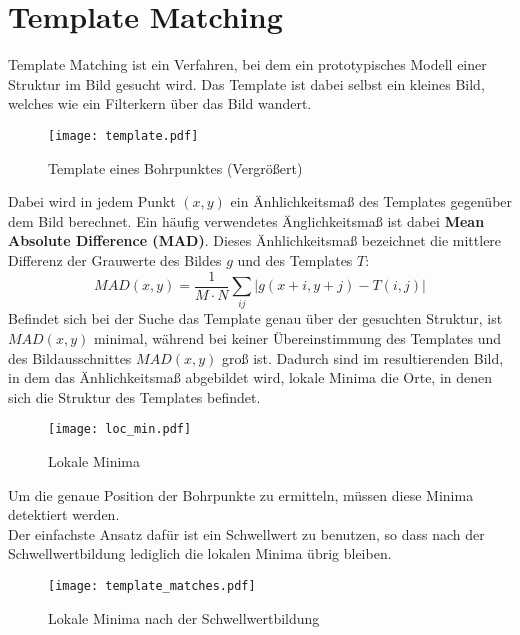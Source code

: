 \section{Template Matching}
	Template Matching ist ein Verfahren, bei dem ein prototypisches Modell einer Struktur im Bild gesucht wird. Das Template ist dabei selbst ein kleines Bild, welches wie ein Filterkern über das Bild wandert.
\begin{figure}[H]
  \begin{center}
    \texttt{[image: template.pdf]}
    \caption{Template eines Bohrpunktes (Vergrößert)}
    \label{fig:template}
  \end{center}
\end{figure}
Dabei wird in jedem Punkt $(x, y)$ ein Änhlichkeitsmaß des Templates gegenüber dem Bild berechnet.
Ein häufig verwendetes Änglichkeitsmaß ist dabei \textbf{Mean Absolute Difference (MAD)}.
Dieses Änhlichkeitsmaß bezeichnet die mittlere Differenz der Grauwerte des Bildes $g$ und des Templates $T$:
\begin{equation*}
MAD(x, y) = \frac{1}{M \cdot N} \sum_{ij}^{{}} \left | g(x +i, y + j) - T(i, j) \right |
\end{equation*}
Befindet sich bei der Suche das Template genau über der gesuchten Struktur, ist $MAD(x, y)$ minimal, während bei keiner Übereinstimmung des Templates und des Bildausschnittes $MAD(x, y)$ groß ist. Dadurch sind im resultierenden Bild, in dem das Änhlichkeitsmaß abgebildet wird, lokale Minima die Orte, in denen sich die Struktur des Templates befindet.
\begin{figure}[H]
  \begin{center}
    \texttt{[image: loc\_min.pdf]}
    \caption{Lokale Minima}
    \label{fig:localminima}
  \end{center}
\end{figure}

Um die genaue Position der Bohrpunkte zu ermitteln, müssen diese Minima detektiert werden.\\
Der einfachste Ansatz dafür ist ein Schwellwert zu benutzen, so dass nach der Schwellwertbildung lediglich die lokalen Minima übrig bleiben.
\begin{figure}[H]
  \begin{center}
    \texttt{[image: template\_matches.pdf]}
    \caption{Lokale Minima nach der Schwellwertbildung}
    \label{fig:localminima_threshold}
  \end{center}
\end{figure}

